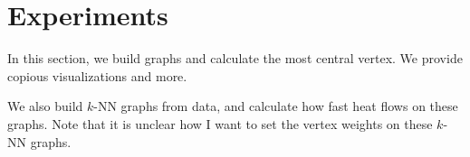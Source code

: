 \section{Experiments}

In this section, we build graphs and calculate the most central
vertex. We provide copious visualizations and more.

We also build $k$-NN graphs from data, and calculate how fast
heat flows on these graphs. Note that it is unclear how I want to
set the vertex weights on these $k$-NN graphs.
